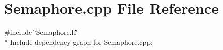 \section{Semaphore.\+cpp File Reference}
\label{_semaphore_8cpp}
{\ttfamily \#include \char`\"{}Semaphore.\+h\char`\"{}}\\*
Include dependency graph for Semaphore.\+cpp\+:
